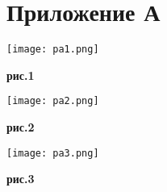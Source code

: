 \newpage
\section{Приложение А}

\begin{center}
\texttt{[image: pa1.png]}

\vspace{-.5em}

\textbf{рис.1}

\vspace{1em}

\texttt{[image: pa2.png]}

\vspace{-.5em}

\textbf{рис.2}

\vspace{1em}

\texttt{[image: pa3.png]}

\vspace{-.5em}

\textbf{рис.3}
\end{center}
